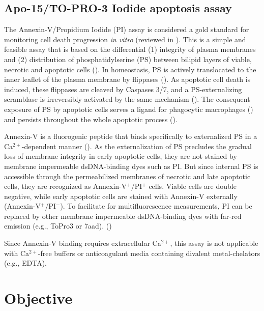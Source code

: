 \subsection{Apo-15/TO-PRO-3 Iodide apoptosis assay}
The Annexin-V/Propidium Iodide (PI) assay is considered a gold standard for monitoring cell death progression \emph{in vitro} (reviewed in \cite{VanEngeland1998}). This is a simple and feasible assay that is based on the differential (1) integrity of plasma membranes and (2) distribution of phosphatidylserine (PS) between bilipid layers of viable, necrotic and apoptotic cells (\cite{Jiang2016}). In homeostasis, PS is actively translocated to the inner leaflet of the plasma membrane by flippases (\cite{Connor1992}). As apoptotic cell death is induced, these flippases are cleaved by Caspases 3/7, and a PS-externalizing scramblase is irreversibly activated by the same mechanism (\cite{Verhoven1995, Suzuki2013}). The consequent exposure of PS by apoptotic cells serves a ligand for phagocytic macrophages (\cite{Fadok1992}) and persists throughout the whole apoptotic process (\cite{Martin1995}).

Annexin-V is a fluorogenic peptide that binds specifically to externalized PS in a Ca$^{2+}$-dependent manner (\cite{Andree1990, Martin1995}). As the externalization of PS precludes the gradual loss of membrane integrity in early apoptotic cells, they are not stained by membrane impermeable dsDNA-binding dyes such as PI. But since internal PS is accessible through the permeabilized membranes of necrotic and late apoptotic cells, they are recognized as Annexin-V$^{+}$/PI$^{+}$ cells. Viable cells are double negative, while early apoptotic cells are stained with Annexin-V externally (Annexin-V$^{+}$/PI$^{-}$). To facilitate for multifluorescence measurements, PI can be replaced by other membrane impermeable dsDNA-binding dyes with far-red emission (e.g., ToPro3 or \acrshort{7aad}). (\cite{Jiang2016})

Since Annexin-V binding requires extracellular Ca$^{2+}$, this assay is not applicable with Ca$^{2+}$-free buffers or anticoagulant media containing divalent metal-chelators (e.g., EDTA). 


\newpage



\cite{Barth2020}


\section{Objective}
